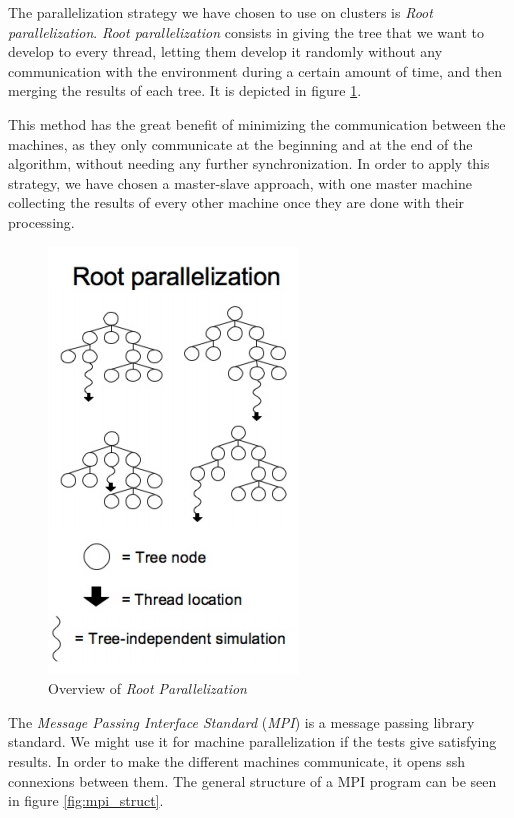 The parallelization strategy we have chosen to use on clusters is \emph{Root parallelization}.
\emph{Root parallelization} consists in giving the tree that we want to develop to every thread, letting them develop it randomly without any communication with the environment during a certain amount of time, and then merging the results of each tree.
It is depicted in figure \ref{fig:root}.

This method has the great benefit of minimizing the communication between the machines, as they only communicate at the beginning and at the end of the algorithm, without needing any further synchronization.
In order to apply this strategy, we have chosen a master-slave approach, with one master machine collecting the results of every other machine once they are done with their processing.

\begin{figure}[!ht] 
\centerline{\includegraphics[scale=0.5]{Parallelisation/Strategy/Img/root.png}}
   \caption{Overview of \emph{Root Parallelization} \cite{parallel_comp}}
\label{fig:root}
\end{figure}

The \emph{Message Passing Interface Standard} (\emph{MPI}) is a message passing library standard.
We might use it for machine parallelization if the tests give satisfying results.
In order to make the different machines communicate, it opens ssh connexions between them.
The general structure of a MPI program can be seen in figure \ref{fig:mpi_struct}.

